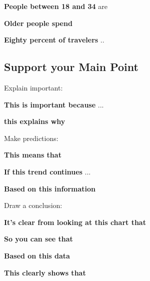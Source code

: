 \documentclass{article}
\begin{document}
\textbf{People between 18 and 34} are

\textbf{Older people spend}

\textbf{Eighty percent of travelers} ..

\subsection{Support your Main Point}
Explain important:

\textbf{This is important because} ...

\textbf{this explains why} 

Make predictions:

\textbf{This means that} 

\textbf{If this trend continues} ...

\textbf{Based on this information}

Draw a conclusion:

\textbf{It's clear from looking at this chart that}

\textbf{So you can see that}

\textbf{Based on this data}

\textbf{This clearly shows that}





 
\end{document}

